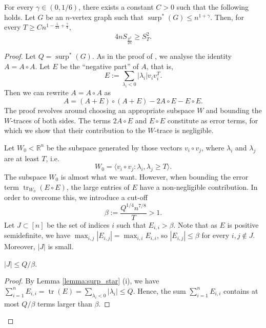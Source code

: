 \documentclass[10pt,a4paper]{amsart}
\DeclareMathOperator{\surp}{surp}
\DeclareMathOperator{\trace}{tr}
\begin{document}
\begin{lemma}\label{lemma:main_MaxCut}
For every $\gamma \in (0,1/6)$, there exists a constant $C>0$ such that the following holds.
Let $G$ be an $n$-vertex graph such that $\surp^*(G)\leq n^{1+\gamma}$. 
Then, for every $T\geq Cn^{1-\frac{1}{24}+\frac{\gamma}{4}}$,
$$4nS_{\frac{T^2}{2n}}\geq S_T^2.$$
\end{lemma}

\begin{proof}
Let $Q=\surp^*(G)$. 
As in the proof of , we analyse the identity $A=A\circ A$. Let $E$ be the ``negative part'' of $A$, that is, $$E:=\sum_{\lambda_i<0}|\lambda_i|v_iv_i^T.$$ 
Then we can rewrite $A=A\circ A$ as
\begin{equation}\label{equ:mainlemma1}
A=(A+E)\circ (A+E)-2A\circ E-E\circ E.
\end{equation}
The proof revolves around choosing an appropriate subspace $W$ and bounding the $W$-traces of both sides. The terms $2A\circ E$ and $E\circ E$ constitute as error terms, for which we show that their contribution to the $W$-trace is negligible.

Let $W_0<\mathbb{R}^n$ be the subspace generated by those vectors $v_i\circ v_j$, where $\lambda_i$ and $\lambda_j$ are at least $T$, i.e.
$$W_0=\langle v_i\circ v_j : \lambda_i,\lambda_j\geq T\rangle.$$
The subspace $W_0$ is almost what we want. However, when bounding the error term $\trace_{W_0}(E\circ E)$, the large entries of $E$ have a non-negligible contribution. In order to overcome this, we introduce a cut-off 
$$\beta:=\frac{Q^{1/4}n^{7/8}}{T}>1.$$
Let $J\subset[n]$ be the set of indices $i$ such that $E_{i,i}>\beta$. Note that as $E$ is positive semidefinite, we have $\max_{i,j}|E_{i,j}|=\max_{i,i}E_{i,i}$, so $|E_{i,j}|\leq \beta$ for every $i,j\notin J$. Moreover, $|J|$ is small.



\begin{claim}
$|J|\leq Q/\beta.$
\end{claim}
\begin{proof}
    By Lemma \ref{lemma:surp_star} (i), we have 
        $\sum_{i=1}^n E_{i,i}=\trace(E)=\sum_{\lambda_i<0}|\lambda_i|\leq Q.$
    Hence, the sum $\sum_{i=1}^n E_{i,i}$ contains at most $Q/\beta$ terms larger than $\beta$.
\end{proof}


\end{proof}
\end{document}
